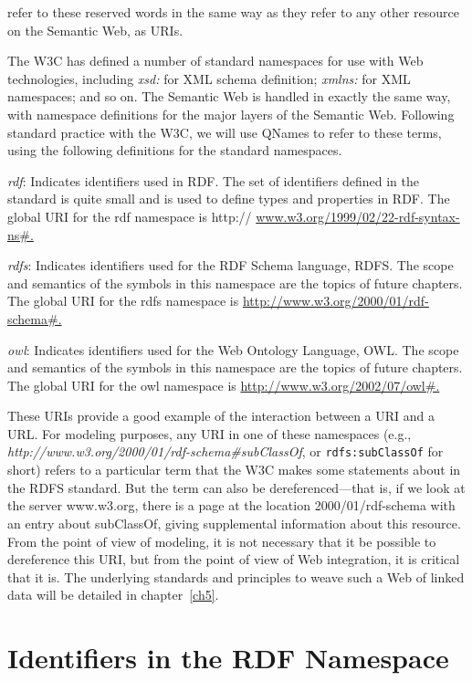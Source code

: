 refer to these reserved words in the same way as they refer to any other
resource on the Semantic Web, as URIs.

The W3C has defined a number of standard namespaces for use with Web
technologies, including \emph{xsd:} for XML schema definition;
\emph{xmlns:} for XML namespaces; and so on. The Semantic Web is handled
in exactly the same way, with namespace definitions for the major layers
of the Semantic Web. Following standard practice with the W3C, we will
use QNames to refer to these terms, using the following definitions for
the standard namespaces.

\emph{rdf}: Indicates identifiers used in RDF. The set of identifiers defined
in the standard is quite small and is used to define types and
properties in RDF. The global URI for the rdf namespace is http://
\href{http://www.w3.org/1999/02/22-rdf-syntax-ns}{www.w3.org/1999/02/22-rdf-syntax-ns\#.}

\emph{rdfs}: Indicates identifiers used for the RDF Schema language, RDFS. The
scope and semantics of the symbols in this namespace are the topics of
future chapters. The global URI for the rdfs namespace is
\href{http://www.w3.org/2000/01/rdf-schema}{http://www.w3.org/2000/01/rdf-schema\#.}

\emph{owl}: Indicates identifiers used for the Web Ontology Language, OWL. The
scope and semantics of the symbols in this namespace are the topics of
future chapters. The global URI for the owl namespace is
\href{http://www.w3.org/2002/07/owl}{http://www.w3.org/2002/07/owl\#.}

These URIs provide a good example of the interaction between a URI and a
URL. For modeling purposes, any URI in one of these namespaces (e.g.,
\emph{http://www.w3.org/2000/01/rdf-schema\#subClassOf}, or
\texttt{rdfs:subClassOf} for short) refers to a particular term that the W3C
makes some statements about in the RDFS standard. But the term can also
be dereferenced---that is, if we look at the server
www.w3.org, there is a page at the location
2000/01/rdf-schema with an entry about subClassOf, giving supplemental
information about this resource. From the point of view of modeling, it
is not necessary that it be possible to dereference this URI, but from
the point of view of Web integration, it is critical that it is. The
underlying standards and principles to weave such a Web of linked data
will be detailed in chapter~\ref{ch5}.

\section{Identifiers in the RDF Namespace}

